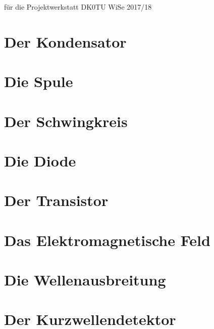 \documentclass[ngerman, openany, twoside]{Script}
\begin{document}

%
	{für die Projektwerkstatt DK0TU}%
	{WiSe 2017/18}%

\newpage

\newpage
\tableofcontents
\newpage





\chapter{Der Kondensator}


\chapter{Die Spule}


\chapter{Der Schwingkreis}


\chapter{Die Diode}


\chapter{Der Transistor}


\newpage \vspace*{5cm}
\newpage

\chapter{Das Elektromagnetische Feld}


\newpage \vspace*{5cm}
\newpage

\chapter{Die Wellenausbreitung}


\chapter{Der Kurzwellendetektor}

\end{document}
